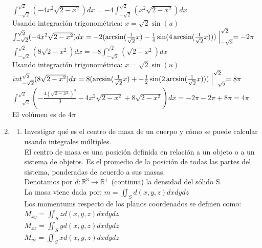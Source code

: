 \documentclass{article}
\begin{document}
\begin{enumerate}
{		$\int_{-\sqrt{2}}^{\sqrt{2}}(-4x^2\sqrt{2-x^2})dx = -4\int_{-\sqrt{2}}^{\sqrt{2}}(x^2\sqrt{2-x^2})dx$\\
		Usando integración trigonométrica: $x = \sqrt{2}\sin(u)$\\
		$\int_{-\sqrt{2}}^{\sqrt{2}}(-4x^2\sqrt{2-x^2})dx = -2(\arcsin(\frac{1}{\sqrt{2}}x) - \frac{1}{4}\sin(4\arcsin(\frac{1}{\sqrt{2}}x)))\Bigm|_{-\sqrt{2}}^{\sqrt{2}} = -2\pi$\\
		
		$\int_{-\sqrt{2}}^{\sqrt{2}}(8\sqrt{2-x^2})dx = -8\int_{-\sqrt{2}}^{\sqrt{2}}(\sqrt{2-x^2})dx$\\
		Usando integración trigonométrica: $x = \sqrt{2}\sin(u)$\\
		$int_{-\sqrt{2}}^{\sqrt{2}}(8\sqrt{2-x^2})dx = 8(\arcsin(\frac{1}{\sqrt{2}}x)+- \frac{1}{2}\sin(2\arcsin(\frac{1}{\sqrt{2}}x)))\Bigm|_{-\sqrt{2}}^{\sqrt{2}} = 8\pi$\\
		
		
		$\int_{-\sqrt{2}}^{\sqrt{2}}(-\frac{4(\sqrt{2-x^2})^3}{3} -4x^2\sqrt{2-x^2} + 8\sqrt{2-x^2})dx = -2\pi -2\pi + 8\pi = 4\pi$\\
		
		El volúmen es de $4\pi $\\
		
    }

   \item {
    \begin{enumerate}
	\item
	Investigar qué es el centro de masa de un cuerpo y cómo se puede calcular usando integrales múltiples.\\	
	
	El centro de masa es una posición definida en relación a un objeto o a un sistema de objetos. Es el promedio de la posición de todas las partes del sistema, ponderadas de acuerdo a sus masas.\\
	
	Denotamos por $d : \mathbb{R}^3 \rightarrow \mathbb{R}^+$ (continua) la densidad del sólido S.\\
	
	La masa viene dada por:	$m = \iint_S d(x,y,z)dxdydz$\\
	
	Los momentums respecto de los planos coordenados se definen como:\\
	$M_{xy} = \iint_S zd(x,y,z)dxdydz$\\
	$M_{xz} = \iint_S yd(x,y,z)dxdydz$\\
	$M_{yz} = \iint_S xd(x,y,z)dxdydz$\\
	

\end{enumerate}}
\end{enumerate}
\end{document}
